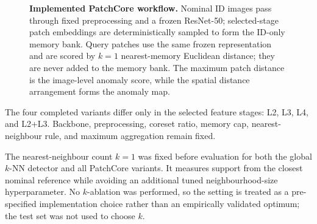 \documentclass[fleqn,12pt]{olplainarticle}
\begin{document}
\begin{figure}[htbp]
    \caption[ID-only PatchCore fitting and query scoring.]{
    \textbf{Implemented PatchCore workflow.} Nominal ID images pass through
    fixed preprocessing and a frozen ResNet-50; selected-stage patch
    embeddings are deterministically sampled to form the ID-only memory bank.
    Query patches use the same frozen representation and are scored by
    $k=1$ nearest-memory Euclidean distance; they are never added to the memory
    bank. The maximum patch distance is the image-level anomaly score, while
    the spatial distance arrangement forms the anomaly map.}
    \label{fig:patchcore_implementation}
\end{figure}

The four completed variants differ only in the selected feature stages:
L2, L3, L4, and L2+L3. Backbone, preprocessing, coreset ratio, memory cap,
nearest-neighbour rule, and maximum aggregation remain fixed.

The nearest-neighbour count $k=1$ was fixed before evaluation for both the
global $k$-NN detector and all PatchCore variants. It measures support from
the closest nominal reference while avoiding an additional tuned
neighbourhood-size hyperparameter. No $k$-ablation was performed, so the
setting is treated as a pre-specified implementation choice rather than an
empirically validated optimum; the test set was not used to choose $k$.
\end{document}
